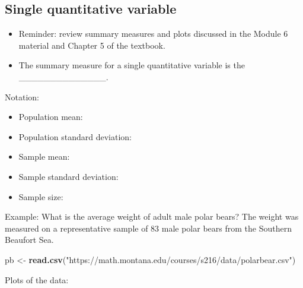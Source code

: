 \documentclass[
]{report}
\newenvironment{Shaded}{\begin{snugshade}}{\end{snugshade}}
\newcommand{\FunctionTok}[1]{\textcolor[rgb]{0.13,0.29,0.53}{\textbf{#1}}}
\newcommand{\NormalTok}[1]{#1}
\newcommand{\OtherTok}[1]{\textcolor[rgb]{0.56,0.35,0.01}{#1}}
\newcommand{\StringTok}[1]{\textcolor[rgb]{0.31,0.60,0.02}{#1}}
\begin{document}

\subsection{Single quantitative variable}\label{single-quantitative-variable}

\begin{itemize}
\item
  Reminder: review summary measures and plots discussed in the Module 6 material and Chapter 5 of the textbook.
\item
  The summary measure for a single quantitative variable is the \_\_\_\_\_\_\_\_\_\_\_\_\_\_.
\end{itemize}


Notation:

\begin{itemize}
\item
  Population mean:
\item
  Population standard deviation:
\item
  Sample mean:
\item
  Sample standard deviation:
\item
  Sample size:
\end{itemize}


Example: What is the average weight of adult male polar bears? The weight was measured on a representative sample of 83 male polar bears from the Southern Beaufort Sea.

\begin{Shaded}
\begin{Highlighting}[]
\NormalTok{pb }\OtherTok{\textless{}{-}} \FunctionTok{read.csv}\NormalTok{(}\StringTok{"https://math.montana.edu/courses/s216/data/polarbear.csv"}\NormalTok{)}
\end{Highlighting}
\end{Shaded}

Plots of the data:
\end{document}

